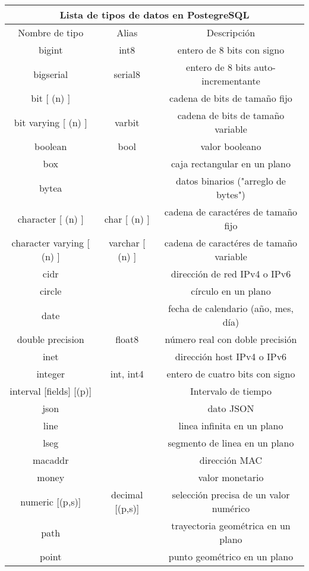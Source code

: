 \documentclass{article}
\begin{document}
\begin{center}
\begin{tabular}{ |c|c|c|  }
 \hline
 \multicolumn{3}{|c|}{Lista de tipos de datos en PostegreSQL} \\
 \hline
Nombre de tipo & Alias & Descripción\\
\hline
bigint & int8 & entero de 8 bits con signo\\
\hline
bigserial & serial8 & entero de 8 bits auto-incrementante\\
\hline
bit [ (n) ] &  & cadena de bits de tamaño fijo\\
\hline
bit varying [ (n) ] & varbit &  cadena de bits de tamaño variable\\
\hline
boolean & bool & valor booleano\\
\hline
box & & caja rectangular en un plano\\
\hline
bytea & & datos binarios ("arreglo de bytes")\\
\hline
character [ (n) ] & char [ (n) ]& cadena de caractéres de tamaño fijo\\
\hline
character varying [ (n) ] & varchar [ (n) ] & cadena de caractéres de tamaño variable \\
\hline
cidr & & dirección de red IPv4 o IPv6\\
\hline
circle & & círculo en un plano\\
\hline
date & & fecha de calendario (año, mes, día)\\
\hline
double precision & float8 & número real con doble precisión\\
\hline
inet & & dirección host IPv4 o IPv6\\
\hline
integer & int, int4 & entero de cuatro bits con signo\\
\hline
interval [fields] [(p)] && Intervalo de tiempo\\
\hline
json && dato JSON\\
\hline
line && linea infinita en un plano\\
\hline
lseg && segmento de linea en un plano\\
\hline
macaddr && dirección MAC\\
\hline
money && valor monetario\\
\hline
numeric [(p,s)] & decimal [(p,s)] & selección precisa de un valor numérico\\
\hline
path && trayectoria geométrica en un plano\\
\hline
point && punto geométrico en un plano\\
\hline

\end{tabular}
\end{center}
\end{document}
